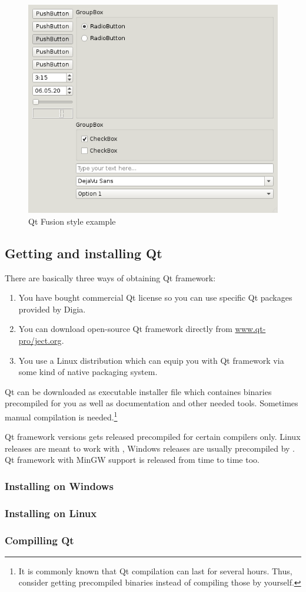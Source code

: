 \begin{figure}[ht]
\caption{Qt Fusion style example}\label{figure:fusion}
\centering\includegraphics{graphics/laboratory/01-fusion.png}
\end{figure}

\subsection{Getting and installing Qt}
There are basically three ways of obtaining Qt framework:
\begin{enumerate}
\item You have bought commercial Qt license so you can use specific Qt packages provided by Digia.
\item You can download open-source Qt framework directly from \href{http://www.qt-project.org/}{www.qt-pro\-/ject.org}.
\item You use a Linux distribution which can equip you with Qt framework via some kind of native packaging system.
\end{enumerate}

Qt can be downloaded as executable installer file which containes binaries precompiled for you as well as documentation and other needed tools. Sometimes manual compilation is needed.\footnote{It is commonly known that Qt compilation can last for several hours. Thus, consider getting precompiled binaries instead of compiling those by yourself.}

Qt framework versions gets released precompiled for certain compilers only. Linux releases are meant to work with , Windows releases are usually precompiled by . Qt framework with MinGW support is released from time to time too.

\subsubsection{Installing on Windows}


\subsubsection{Installing on Linux}

\subsubsection{Compilling Qt}
